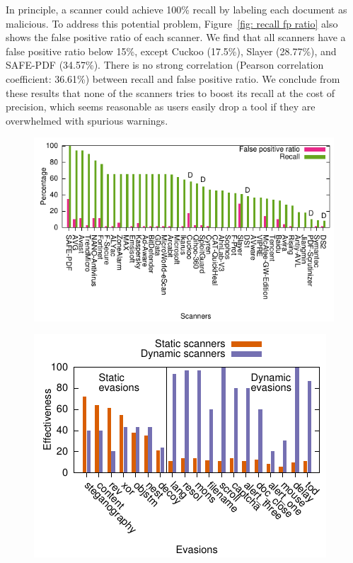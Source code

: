 In principle, a scanner could achieve 100\% recall by labeling each document 
as malicious.
To address this potential problem, Figure~\ref{fig: recall fp ratio} also 
shows the false positive ratio of each scanner.
We find that all scanners have a false positive ratio below 15\%, except Cuckoo (17.5\%), Slayer (28.77\%), and SAFE-PDF (34.57\%).
There is no strong correlation (Pearson correlation coefficient: 36.61\%) between recall and false positive ratio.
We conclude from these results that none of the scanners tries to boost its 
recall at the cost of precision, which seems reasonable as users easily drop 
a tool if they are overwhelmed with spurious warnings.


\begin{figure}[t]
	\begin{minipage}{0.55\textwidth}
		\hspace{-.6em}\includegraphics{figures/fp-ratio-recall}
		\label{fig: recall fp ratio}
	\end{minipage}
	\hfill
	\begin{minipage}{0.4\textwidth}
		\hspace{-.6em}\includegraphics{figures/average-best-case-eff}
		\label{fig: best case eff}
	\end{minipage}		
\end{figure}	


